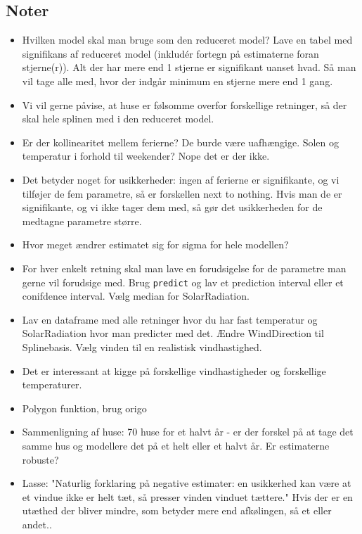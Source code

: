 \subsection{Noter}
\begin{itemize}
        \item Hvilken model skal man bruge som den reduceret model? Lave en tabel med signifikans af reduceret model (inkludér fortegn på estimaterne foran stjerne(r)). Alt der har mere end 1 stjerne er signifikant uanset hvad. Så man vil tage alle med, hvor der indgår minimum en stjerne mere end 1 gang. 
        \item Vi vil gerne påvise, at huse er følsomme overfor forskellige retninger, så der skal hele splinen med i den reduceret model. 
        \item Er der kollinearitet mellem ferierne? De burde være uafhængige. Solen og temperatur i forhold til weekender? Nope det er der ikke. 
        \item Det betyder noget for usikkerheder: ingen af ferierne er signifikante, og vi tilføjer de fem parametre, så er forskellen next to nothing. Hvis man de er signifikante, og vi ikke tager dem med, så gør det usikkerheden for de medtagne parametre større. 
        \item Hvor meget ændrer estimatet sig for sigma for hele modellen? 
        \item For hver enkelt retning skal man lave en forudsigelse for de parametre man gerne vil forudsige med. Brug \texttt{predict} og lav et prediction interval eller et conifdence interval. Vælg median for SolarRadiation. 
        \item Lav en dataframe med alle retninger hvor du har fast temperatur og SolarRadiation hvor man predicter med det. Ændre WindDirection til Splinebasis. Vælg vinden til en realistisk vindhastighed. 
        \item Det er interessant at kigge på forskellige vindhastigheder og forskellige temperaturer. 
        \item Polygon funktion, brug origo 
        \item Sammenligning af huse: 70 huse for et halvt år - er der forskel på at tage det samme hus og modellere det på et helt eller et halvt år. Er estimaterne robuste?
        \item Lasse: "Naturlig forklaring på negative estimater: en usikkerhed kan være at et vindue ikke er helt tæt, så presser vinden vinduet tættere." Hvis der er en utæthed der bliver mindre, som betyder mere end afkølingen, så et eller andet.. 
\end{itemize}

